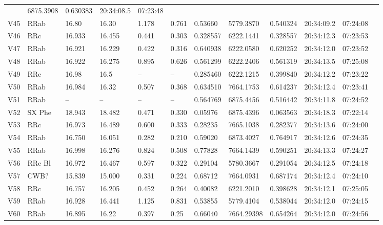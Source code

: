 \documentclass[journal]{rmaa}
\newcommand{\1}{\'{\i}}
\begin{document}
\begin{table*}
\begin{center}
\begin{tabular}{llllllllllll}
        &6875.3908       &0.630383    &20:34:08.5 & 07:23:48\\
V45       & RRab     &16.80   & 16.30  & 1.178 & 0.761   & 0.53660
       & 5779.3870     & 0.540324   &20:34:09.2  & 07:24:08\\
V46       & RRc     &16.933   &16.455  & 0.441 & 0.303   &0.328557
       & 6222.1441     & 0.328557   & 20:34:12.3  & 07:23:53\\
V47       & RRab     &16.921   & 16.229  & 0.422 & 0.316   & 0.640938
       & 6222.0580   & 0.620252   &20:34:12.0  & 07:23:52\\
V48       & RRab     &16.922  &16.275 & 0.895 & 0.626   & 0.561299
       & 6222.2406     & 0.561319&20:34:13.5 &  07:25:08\\
V49       & RRc      & 16.98   &16.5   &--   & --  &0.285460
       &6222.1215     &0.399840   & 20:34:12.2  & 07:23:22\\
V50       & RRab      &16.984   & 16.32  &  0.507&0.368  &0.634510
        & 7664.1753    & 0.614237   & 20:34:12.4  & 07:23:41\\
V51       & RRab     &--   & --  & -- & --   & 0.564769
       & 6875.4456   & 0.516442   &20:34:11.8 &  07:24:52\\
V52       & SX Phe     &18.943   & 18.482  &0.471 & 0.330  & 0.05976
       &6875.4396    & 0.063563 &20:34:18.3  & 07:22:14\\
V53       & RRc      &16.973   &16.489   &0.600   &0.333 &0.28235
       &7665.1038    &0.282377   & 20:34:13.6 &  07:24:00\\
V54       & RRab      &16.750   & 16.051  &  0.282& 0.210 &0.59020
        & 6873.4027    & 0.764917   & 20:34:12.6 &  07:24:35\\
V55       & RRab     &16.998  & 16.276 & 0.824  & 0.508  & 0.77828
        & 7664.1439      &0.590251   & 20:34:13.3 &  07:24:27\\
V56       & RRc Bl    & 16.972 & 16.467 &0.597   & 0.322  & 0.29104
       & 5780.3667     &0.291054  & 20:34:12.5 &  07:24:18\\
V57       & CWB?      & 15.839  &15.000  & 0.331  & 0.224  & 0.68712
       & 7664.0931     &0.687174   &20:34:12.4 &  07:24:10\\
V58      & RRc    &16.757  & 16.205 & 0.452 & 0.264   & 0.40082
       & 6221.2010   & 0.398628   & 20:34:12.1 &  07:25:05\\
V59       & RRab    &16.928  & 16.441 & 1.125  & 0.831  & 0.53855
        & 5779.4104      &0.538044   & 20:34:12.0  & 07:24:15\\
V60       & RRab     &16.895 & 16.22 &0.397   & 0.25 & 0.66040
       & 7664.29398     &0.654264  & 20:34:12.0 &  07:24:56\\
\hline
\end{tabular}
\end{center}
\end{table*}
\end{document}
